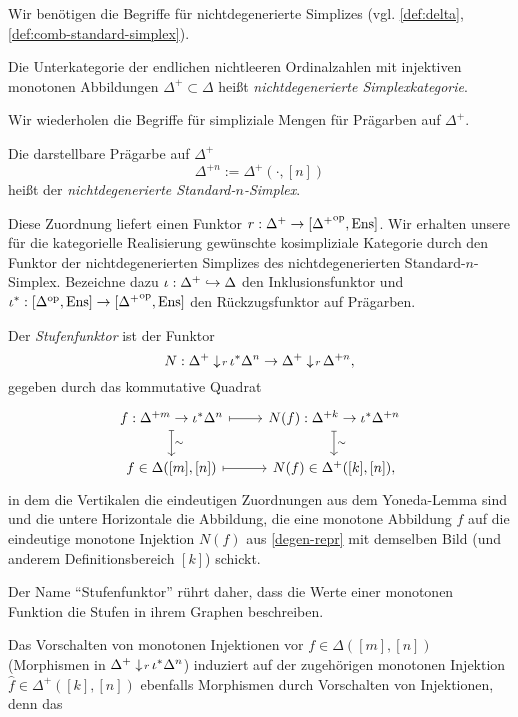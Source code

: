 Wir benötigen die Begriffe für nichtdegenerierte Simplizes
(vgl. \ref{def:delta}, \ref{def:comb-standard-simplex}).
\begin{defn}
  Die Unterkategorie der endlichen nichtleeren Ordinalzahlen mit
  injektiven monotonen Abbildungen $\Delta^+ \subset \Delta$ heißt
  \emph{nichtdegenerierte Simplexkategorie}.
\end{defn}
Wir wiederholen die Begriffe für simpliziale Mengen für Prägarben auf
$\Delta^+$.
\begin{defn}
  Die darstellbare Prägarbe auf $\Delta^+$
  \[ \Delta^{+n} :=  \Delta^+(\cdot, [n]) \]
  heißt der \emph{nichtdegenerierte Standard-$n$-Simplex}.
\end{defn}
Diese Zuordnung liefert einen Funktor $r: \Delta^+ \to [{\Delta^+}^\mathrm{op},
  \operatorname{Ens}]$. Wir erhalten unsere für die kategorielle Realisierung
gewünschte kosimpliziale Kategorie durch den Funktor der
nichtdegenerierten Simplizes des nichtdegenerierten
Standard-$n$-Simplex. Bezeichne dazu $\iota: \Delta^+ \hookrightarrow \Delta$ den
Inklusionsfunktor und $\iota^*: [\Delta^\mathrm{op}, \operatorname{Ens}] \to [{\Delta^+}^\mathrm{op},
  \operatorname{Ens}]$ den Rückzugsfunktor auf Prägarben.
\begin{defn}
  Der \emph{Stufenfunktor} ist der Funktor
  \[N: \Delta^+ \downarrow \! {\scriptstyle r} \, \iota^* \Delta^n
  \to \Delta^+ \downarrow \! {\scriptstyle r} \, \Delta^{+n},
  \]
  gegeben durch das kommutative Quadrat
  \[ 
  \begin{tikzcd}
    f: \Delta^{+m} \to \iota^* \Delta^n \dar[mapsto]{\sim} \rar[mapsto]
    & N(f):  \Delta^{+k}  \to \iota^* \Delta^{+n} \dar[mapsto]{\sim} \\
    f \in \Delta([m], [n]) \rar[mapsto]
    & N(f) \in \Delta^+([k], [n]),
  \end{tikzcd}
  \]
  in dem die Vertikalen die eindeutigen Zuordnungen aus dem
  Yoneda-Lemma sind und die untere Horizontale die Abbildung, die eine
  monotone Abbildung $f$ auf die eindeutige monotone Injektion $N(f)$
  aus \ref{degen-repr} mit demselben Bild (und anderem
  Definitionsbereich $[k]$) schickt.
\end{defn}
\begin{bem}
  Der Name ``Stufenfunktor'' rührt daher, dass die Werte einer
  monotonen Funktion die Stufen in ihrem Graphen beschreiben.
\end{bem}
Das Vorschalten von monotonen Injektionen vor $f \in \Delta([m], [n])$
(Morphismen in $\Delta^+ \downarrow \! {\scriptstyle r} \, \iota^* \Delta^n$) induziert
auf der zugehörigen monotonen Injektion $\hat{f} \in \Delta^+([k],
[n])$ ebenfalls Morphismen durch Vorschalten von Injektionen, denn das
